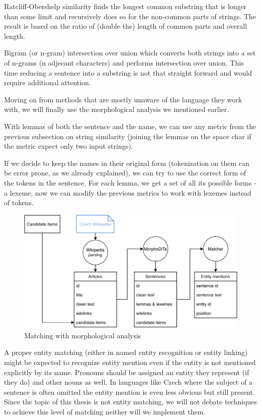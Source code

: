 Ratcliff-Obershelp similarity finds the longest common substring that is longer than some limit and recursively does so for the non-common parts of strings. The result is based on the ratio of (double the) length of common parts and overall length. 

Bigram (or n-gram) intersection over union which converts both strings into a set of n-grams (n adjecant characters) and performs intersection over union. This time reducing a sentence into a substring is not that straight forward and would require additional attention.


Moving on from methods that are mostly unaware of the language they work with, we will finally use the morphological analysis we mentioned earlier.

With lemmas of both the sentence and the name, we can use any metric from the previous subsection on string similarity (joining the lemmas on the space char if the metric expect only two input strings).

If we decide to keep the names in their original form (tokenization on them can be error prone, as we already explained), we can try to use the correct form of the tokens in the sentence. For each lemma, we get a set of all its possible forms - a lexeme, now we can modify the previous metrics to work with lexemes instead of tokens. 


\begin{figure}[h]\centering
\includegraphics[width=140mm]{./img/Diplomka diagramy-Detailed_text}
\caption{Matching with morphological analysis}
\label{obr:DiagramTextDetail}
\end{figure}


A proper entity matching (either in named entity recognition or entity linking) might be expected to recognize entity mention even if the entity is not mentioned explicitly by its name. Pronouns should be assigned an entity they represent (if they do) and other nouns as well. In languages like Czech where the subject of a sentence is often omitted the entity mention is even less obvious but still present. Since the topic of this thesis is not entity matching, we will not debate techniques to achieve this level of matching neither will we implement them.

